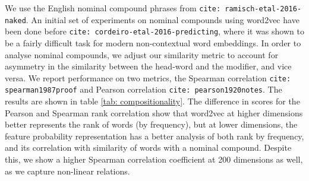 \documentclass[11pt]{book}
\newcommand{\citep}[1]{\texttt{cite: #1}}
\newcommand{\citet}[1]{\texttt{cite: #1}}
\begin{document}
We use the English nominal compound phrases from
\citet{ramisch-etal-2016-naked}. An initial set of experiments on nominal
compounds using word2vec have been done before
\citep{cordeiro-etal-2016-predicting}, where it was shown to be a fairly
difficult task for modern non-contextual word embeddings. In order to analyse
nominal compounds, we adjust our similarity metric to account for asymmetry in
the similarity between the head-word and the modifier, and vice versa. We
report performance on two metrics, the Spearman correlation
\citep{spearman1987proof} and Pearson correlation \citep{pearson1920notes}. 
% 
% 
The results are shown in table \ref{tab: compositionality}. The difference in
scores for the Pearson and Spearman rank correlation show that word2vec at
higher dimensions better represents the rank of words (by frequency), but at
lower dimensions, the feature probability representation has a better analysis
of both rank by frequency, and its correlation with similarity of words with a
nominal compound. Despite this, we show a higher Spearman correlation
coefficient at 200 dimensions as well, as we capture non-linear relations.
\end{document}
